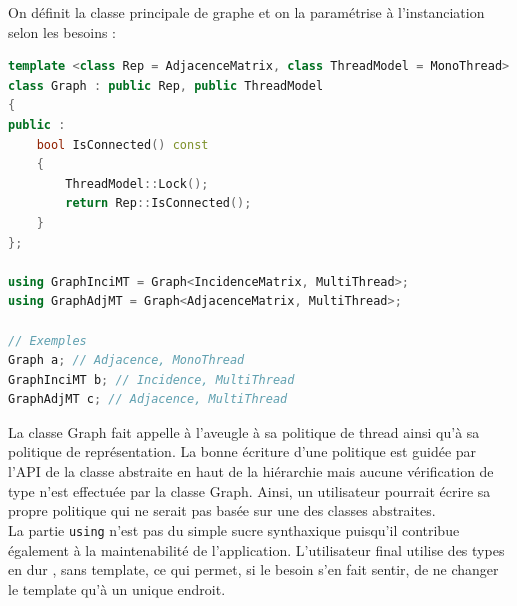 On définit la classe principale de graphe et on la paramétrise à l'instanciation selon les besoins :
\begin{lstlisting}[label=policy_3,caption=Illustration de la paramétrisation,language=C++]
template <class Rep = AdjacenceMatrix, class ThreadModel = MonoThread>
class Graph : public Rep, public ThreadModel
{
public :
    bool IsConnected() const
    {
        ThreadModel::Lock();
        return Rep::IsConnected();
    }
};

using GraphInciMT = Graph<IncidenceMatrix, MultiThread>;
using GraphAdjMT = Graph<AdjacenceMatrix, MultiThread>;

// Exemples
Graph a; // Adjacence, MonoThread
GraphInciMT b; // Incidence, MultiThread
GraphAdjMT c; // Adjacence, MultiThread

\end{lstlisting}

La classe Graph fait appelle à l'aveugle à sa politique de thread ainsi qu'à sa politique de représentation. La bonne écriture d'une politique est guidée par l'API de la classe abstraite en haut de la hiérarchie mais aucune vérification de type n'est effectuée par la classe Graph. Ainsi, un utilisateur pourrait écrire sa propre politique qui ne serait pas basée sur une des classes abstraites.\\
La partie \verb|using| n'est pas du simple sucre synthaxique puisqu'il contribue également à la maintenabilité de l'application. L'utilisateur final utilise des types en \og{} dur \fg, sans template, ce qui permet, si le besoin s'en fait sentir, de ne changer le template qu'à un unique endroit.

